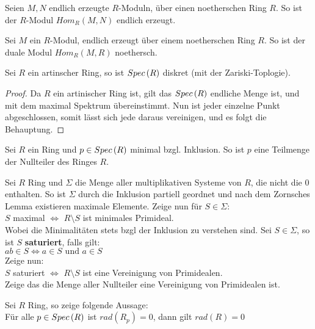 \documentclass[ngerman, parskip=half, titlepage=false]{scrartcl}
\begin{document}
\begin{Satz}
  Seien $M,N$ endlich erzeugte  $R$-Moduln, über einen noetherschen Ring $R$.
  So ist der $R$-Modul $Hom_R(M,N)$ endlich erzeugt.
\end{Satz}

\begin{Kor}
  Sei $M$ ein $R$-Modul, endlich erzeugt über einem noetherschen Ring $R$.
  So ist der duale Modul $Hom_R(M,R)$ noethersch.
\end{Kor}

\begin{Lem}
  Sei $R$ ein artinscher Ring, so ist $Spec \left( R \right)$ diskret (mit der Zariski-Toplogie).
  \begin{proof}
    Da $R$ ein artinischer Ring ist, gilt das $Spec \left( R \right)$ endliche Menge ist, 
    und mit dem maximal Spektrum übereinstimmt. Nun ist jeder einzelne Punkt
    abgeschlossen, somit lässt sich jede daraus vereinigen, und es folgt die 
    Behauptung.
  \end{proof}
\end{Lem}

\begin{Lem}
  Sei $R$ ein Ring und $p \in Spec \left( R \right)$ minimal bzgl. Inklusion. So ist
  $p$ eine Teilmenge der Nullteiler des Ringes $R$.
\end{Lem}

\begin{Beh}
  Sei $R$ Ring und $\Sigma$ die Menge aller multiplikativen Systeme
  von $R$, die nicht die $0$ enthalten. So ist $\Sigma$ durch die
  Inklusion partiell geordnet und nach dem Zornsches Lemma existieren
  maximale Elemente.
  Zeige nun für $S \in \Sigma$:\\
  $S$  maximal $\Leftrightarrow$ $R \setminus S $ ist minimales Primideal.\\
  Wobei die Minimalitäten stets bzgl der Inklusion zu verstehen sind.
  Sei $S \in \Sigma$, so ist $S$ \textbf{saturiert}, falls gilt:\\
  $ab \in S \Leftrightarrow a \in S \text{ und } a \in S$\\
  Zeige nun:\\
  $S$ saturiert $\Leftrightarrow$ $R \setminus S$ ist eine Vereinigung
  von Primidealen.\\
  Zeige das die Menge aller Nullteiler eine Vereinigung von Primidealen ist.
\end{Beh}

\begin{Lem}
  Sei $R$ Ring, so zeige folgende Aussage:\\
  Für alle $p \in Spec \left( R \right)$ ist $rad(R_p)=0$, dann gilt $rad(R) = 0$
\end{Lem}
\end{document}
